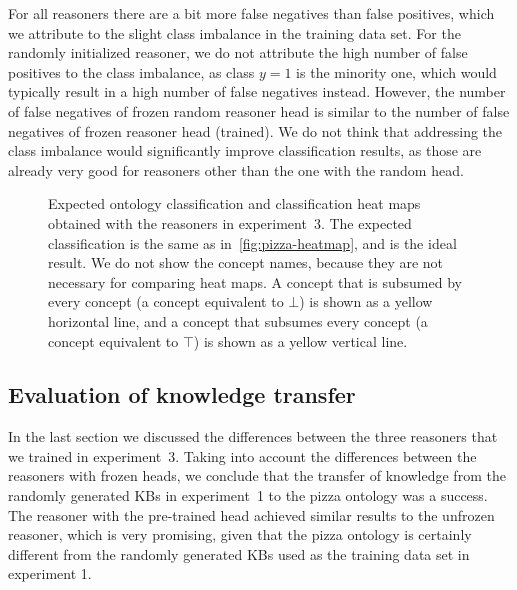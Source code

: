 For all reasoners there are a bit more false negatives than false positives, which we attribute to the slight class imbalance in the training data set.
For the randomly initialized reasoner, we do not attribute the high number of false positives to the class imbalance, as class $y = 1$ is the minority one, which would typically result in a high number of false negatives instead.
However, the number of false negatives of frozen random reasoner head is similar to the number of false negatives of frozen reasoner head (trained).
We do not think that addressing the class imbalance would significantly improve classification results, as those are already very good for reasoners other than the one with the random head.

\begin{figure}
\caption{
Expected ontology classification and classification heat maps obtained with the reasoners in experiment~3.
The expected classification is the same as in~\autoref{fig:pizza-heatmap}, and is the ideal result.
We do not show the concept names, because they are not necessary for comparing heat maps.
A concept that is subsumed by every concept (a concept equivalent to $\bot$) is shown as a yellow horizontal line, and a concept that subsumes every concept (a concept equivalent to $\top$) is shown as a yellow vertical line.
}
\label{fig:ex4-heatmap}
\end{figure}

\subsection{Evaluation of knowledge transfer}

In the last section we discussed the differences between the three reasoners that we trained in experiment~3.
Taking into account the differences between the reasoners with frozen heads, we conclude that the transfer of knowledge from the randomly generated KBs in experiment~1 to the pizza ontology was a success.
The reasoner with the pre-trained head achieved similar results to the unfrozen reasoner, which is very promising, given that the pizza ontology is certainly different from the randomly generated KBs used as the training data set in experiment 1.

